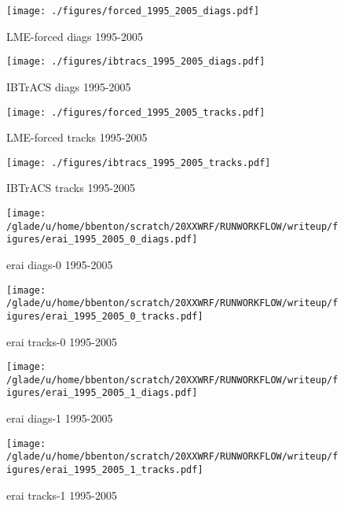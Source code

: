 \begin{figure}[!tbp]
\centering
\begin{minipage}[b]{0.45\textwidth}
\texttt{[image: ./figures/forced\_1995\_2005\_diags.pdf]}
\caption{LME-forced diags 1995-2005}
\end{minipage}
\hfill
\begin{minipage}[b]{0.45\textwidth}
\texttt{[image: ./figures/ibtracs\_1995\_2005\_diags.pdf]}
\caption{IBTrACS diags 1995-2005}
\end{minipage}
\end{figure}

\begin{figure}[!tbp]
\centering
\begin{minipage}[b]{0.45\textwidth}
\texttt{[image: ./figures/forced\_1995\_2005\_tracks.pdf]}
\caption{LME-forced tracks 1995-2005}
\end{minipage}
\hfill
\begin{minipage}[b]{0.45\textwidth}
\texttt{[image: ./figures/ibtracs\_1995\_2005\_tracks.pdf]}
\caption{IBTrACS tracks 1995-2005}
\end{minipage}
\end{figure}

\clearpage

\begin{figure}[!tbp]
\centering
\begin{minipage}[b]{0.45\textwidth}
\texttt{[image: /glade/u/home/bbenton/scratch/20XXWRF/RUNWORKFLOW/writeup/figures/erai\_1995\_2005\_0\_diags.pdf]}
\caption{erai diags-0 1995-2005}
\end{minipage}
\hfill
\begin{minipage}[b]{0.45\textwidth}
\texttt{[image: /glade/u/home/bbenton/scratch/20XXWRF/RUNWORKFLOW/writeup/figures/erai\_1995\_2005\_0\_tracks.pdf]}
\caption{erai tracks-0 1995-2005}
\end{minipage}
\end{figure}

\begin{figure}[!tbp]
\centering
\begin{minipage}[b]{0.45\textwidth}
\texttt{[image: /glade/u/home/bbenton/scratch/20XXWRF/RUNWORKFLOW/writeup/figures/erai\_1995\_2005\_1\_diags.pdf]}
\caption{erai diags-1 1995-2005}
\end{minipage}
\hfill
\begin{minipage}[b]{0.45\textwidth}
\texttt{[image: /glade/u/home/bbenton/scratch/20XXWRF/RUNWORKFLOW/writeup/figures/erai\_1995\_2005\_1\_tracks.pdf]}
\caption{erai tracks-1 1995-2005}
\end{minipage}
\end{figure}

